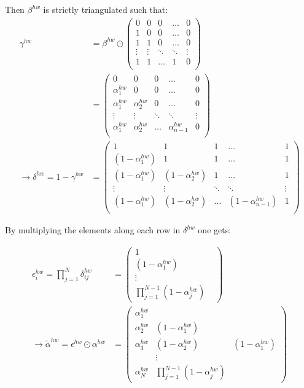Then $\beta^{hw}$ is strictly triangulated such that:
\begin{align}
    \gamma^{hw} & = \beta^{hw} \odot
    \begin{pmatrix}
        0 & 0 & 0 &\hdots & 0\\
        1 & 0 & 0 &\hdots & 0\\
        1 & 1 & 0 &\hdots & 0\\
        \vdots & \vdots & \ddots & \ddots & \vdots \\
        1 & 1 & \hdots & 1 & 0\\
    \end{pmatrix}
    \\ & = 
    \begin{pmatrix}
        0 & 0 & 0 & \hdots & 0\\
        \alpha^{hw}_1 & 0 & 0 & \hdots & 0\\
        \alpha^{hw}_1 & \alpha^{hw}_2 & 0 & \hdots & 0\\
        \vdots & \vdots & \ddots & \ddots & \vdots \\
        \alpha^{hw}_1 & \alpha^{hw}_2 & \hdots & \alpha^{hw}_{n-1} & 0\\
    \end{pmatrix}
    \\
    \rightarrow \delta^{hw} = 1 - \gamma^{hw} & = 
    \begin{pmatrix}
        1 & 1 & 1 & \hdots & 1\\
        (1 - \alpha^{hw}_1) & 1 & 1 & \hdots & 1\\
        (1 - \alpha^{hw}_1) & (1 - \alpha^{hw}_2) & 1 & \hdots & 1\\
        \vdots & \vdots & \ddots & \ddots & \vdots \\
        (1 - \alpha^{hw}_1) & (1 - \alpha^{hw}_2) & \hdots & (1 - \alpha^{hw}_{n-1}) & 1\\
    \end{pmatrix}
\end{align}

By multiplying the elements along each row in $\delta^{hw}$ one gets:

\begin{align}
    \epsilon^{hw}_i = \prod^N_{j=1} \delta^{hw}_{ij} & =
    \begin{pmatrix}
        1  &\\
        (1 - \alpha^{hw}_1) &\\
        \vdots &\\
        \prod^{N-1}_{j=1} (1 - \alpha^{hw}_j)
    \end{pmatrix}
    \\ \rightarrow \tilde{\alpha}^{hw} = \epsilon^{hw} \odot \alpha^{hw} & =
    \begin{pmatrix}
        \alpha^{hw}_1 & &\\
        \alpha^{hw}_2 & (1 - \alpha^{hw}_1) &\\
        \alpha^{hw}_3 & (1 - \alpha^{hw}_2) & (1 - \alpha^{hw}_1)\\
        & \vdots &\\
        \alpha^{hw}_N & \prod^{N-1}_{j=1} (1 - \alpha^{hw}_j)
    \end{pmatrix}
\end{align}

